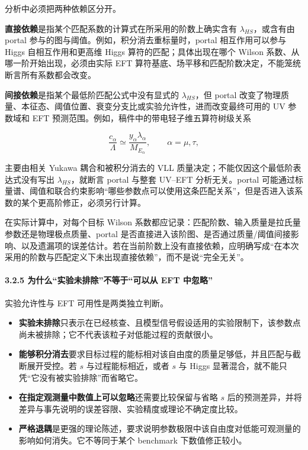 \documentclass[
]{article}
\providecommand{\tightlist}{%
  \setlength{\itemsep}{0pt}\setlength{\parskip}{0pt}}
\begin{document}
分析中必须把两种依赖区分开。

\textbf{直接依赖}是指某个匹配系数的计算式在所采用的阶数上确实含有
\(\lambda_{HS}\)，或含有由 portal
参与的图与阈值。例如，积分消去重标量时，portal 相互作用可以参与 Higgs
自相互作用和更高维 Higgs 算符的匹配；具体出现在哪个 Wilson
系数、从哪一阶开始出现，必须由实际 EFT
算符基底、场平移和匹配阶数决定，不能笼统断言所有系数都会改变。

\textbf{间接依赖}是指某个最低阶匹配公式中没有显式的 \(\lambda_{HS}\)，但
portal
改变了物理质量、本征态、阈值位置、衰变分支比或实验允许性，进而改变最终可用的
UV 参数域和 EFT 预测范围。例如，稿件中的带电轻子维五算符树级关系

\[
\frac{c_\alpha}{\Lambda}\simeq\frac{y_\alpha\lambda_\alpha}{M_{E_\alpha}},\qquad \alpha=\mu,\tau,
\]

主要由相关 Yukawa 耦合和被积分消去的 VLL
质量决定；不能仅因这个最低阶表达式没有写出 \(\lambda_{HS}\)，就断言
portal 与整套 UV--EFT 分析无关。portal
可能通过标量谱、阈值和联合约束影响``哪些参数点可以使用这条匹配关系''，但是否进入该系数的某个更高阶修正，必须另行计算。

在实际计算中，对每个目标 Wilson
系数都应记录：匹配阶数、输入质量是拉氏量参数还是物理极点质量、portal
是否直接进入该阶图、是否通过质量/阈值间接影响、以及遗漏项的误差估计。若在当前阶数上没有直接依赖，应明确写成``在本次采用的阶数与匹配定义下未出现直接依赖''，而不是说``完全无关''。

\paragraph{3.2.5 为什么``实验未排除''不等于``可以从 EFT
中忽略''}\label{ux4e3aux4ec0ux4e48ux5b9eux9a8cux672aux6392ux9664ux4e0dux7b49ux4e8eux53efux4ee5ux4ece-eft-ux4e2dux5ffdux7565}

实验允许性与 EFT 可用性是两类独立判断。

\begin{itemize}
\tightlist
\item
  \textbf{实验未排除}只表示在已经核查、且模型信号假设适用的实验限制下，该参数点尚未被排除；它不代表该粒子对低能过程的贡献很小。
\item
  \textbf{能够积分消去}要求目标过程的能标相对该自由度的质量足够低，并且匹配与截断展开受控。若
  \(s\) 与过程能标相近，或者 \(s\) 与 Higgs
  显著混合，就不能只凭``它没有被实验排除''而省略它。
\item
  \textbf{在指定观测量中数值上可以忽略}还需要比较保留与省略 \(s\)
  后的预测差异，并将差异与事先说明的误差容限、实验精度或理论不确定度比较。
\item
  \textbf{严格退耦}是更强的理论陈述，要求说明参数极限中该自由度对低能可观测量的影响如何消失。它不等同于某个
  benchmark 下数值修正较小。
\end{itemize}
\end{document}
